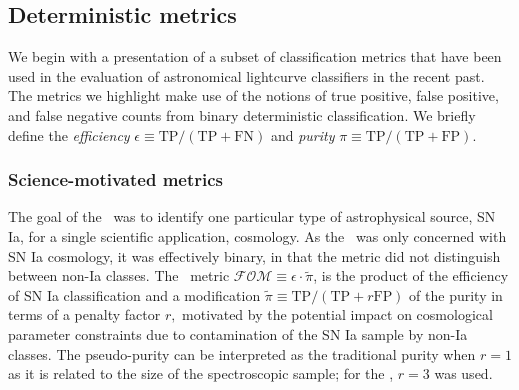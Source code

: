 \subsection{Deterministic metrics}
\label{sec:deterministic}

We begin with a presentation of a subset of classification metrics that have been used in the evaluation of astronomical lightcurve classifiers in the recent past.
The metrics we highlight make use of the notions of true positive, false positive, and false negative counts from binary deterministic classification.
We briefly define the \textit{efficiency} $\epsilon \equiv \mathrm{TP} / (\mathrm{TP} + \mathrm{FN})$ and \textit{purity} $\pi \equiv \mathrm{TP} / (\mathrm{TP} + \mathrm{FP})$.

\subsubsection{Science-motivated metrics}
\label{sec:science}

The goal of the \snphotcc\ was to identify one particular type of astrophysical source, SN Ia, for a single scientific application, cosmology.
As the \snphotcc\ was only concerned with SN Ia cosmology, it was effectively binary, in that the metric did not distinguish between non-Ia classes.
The \snphotcc\ metric $\mathcal{FOM} \equiv \epsilon \cdot \tilde{\pi}$,
is the product of the efficiency
of SN Ia classification and a modification $\tilde{\pi} \equiv \mathrm{TP} / (\mathrm{TP} + r \mathrm{FP})$ of the purity in terms of a penalty factor $r,$
motivated by the potential impact on cosmological parameter constraints due to contamination of the SN Ia sample by non-Ia classes. The pseudo-purity can be interpreted as the traditional purity when $r = 1$ as it is related to the size of the spectroscopic sample; for the \snphotcc, $r=3$ was used.

